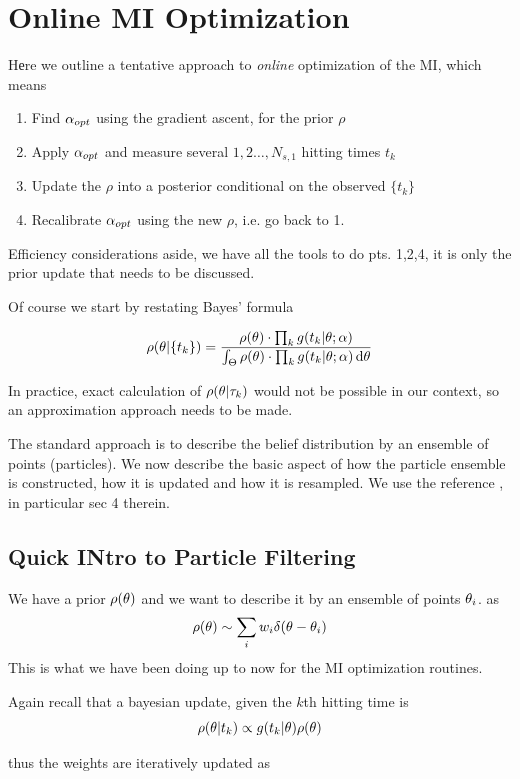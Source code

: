\documentclass{article}
\begin{document}
\clearpage

\section{Online MI Optimization}
Hеre we outline a tentative approach to {\sl online} optimization of the MI,
which means

\begin{enumerate}
  \item Find ${{\alpha}_{opt} }$ using the gradient ascent, for the prior $\rho$
  \item Apply ${{\alpha}_{opt} }$ and measure several $1,2\ldots,N_{s,1}$ hitting times
  $t_k$
  \item Update the $\rho$ into a posterior conditional on the observed $\{t_k\}$
  \item Recalibrate ${{\alpha}_{opt} }$ using the new $\rho$, i.e. go back to 1. 
\end{enumerate}

 Efficiency considerations aside, we have all the tools to do pts. 1,2,4, it
 is only the prior update that needs to be discussed. 

Of course we start by restating Bayes' formula

$$
\rho({\theta}| \{t_k\} ) = 
\frac{  \rho({\theta}) \cdot \prod_k g(t_k|{\theta} ; {\alpha}) }
	 { \int_{\Theta}  \rho({\theta}) \cdot \prod_k g(t_k|{\theta} ; {\alpha})  \, \mathrm{d} {\theta}}
$$

In practice, exact calculation of $\rho({\theta}|{\tau}_k)$ would not be possible in our
context, so an approximation approach needs to be made.

The standard approach is to describe the belief distribution by an ensemble of
points (particles). We now describe the basic aspect of how the particle
ensemble is constructed, how it is updated and how it is resampled. We use the
reference \cite{Granade2012}, in particular sec 4 therein.

\subsection{Quick INtro to Particle Filtering}
We have a prior
$ \rho({\theta})$ and we want to describe it by an ensemble of points ${\theta}_i$.
as 
$$ \rho({\theta}) \sim \sum_i w_i \delta({\theta}-{\theta}_i)$$
This is what we have been doing up to now for the MI optimization routines.

Again recall that a bayesian update, given the $k$th hitting time is
$$ \rho({\theta}|t_k) \propto g(t_k|{\theta})\rho({\theta})$$

thus the weights are iteratively updated as 
\end{document}
